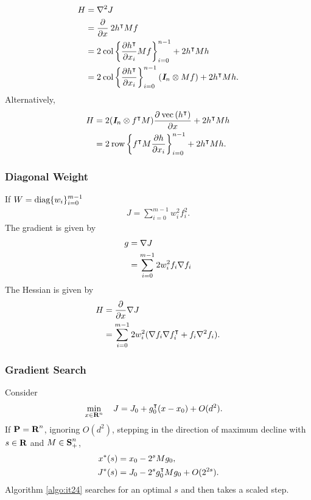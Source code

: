\documentclass{article}
\begin{document}
    \begin{align*}
        H&=\nabla^2 J\\
        &= \frac{\partial }{\partial x}\:2h^\intercal M f\\
        &=2\:\text{col}\left\{
        \frac{\partial h^\intercal}{\partial x_i} M f
        \right\}_{i=0}^{n-1}+2h^\intercal M h\\
        &=2\:\text{col}\left\{
            \frac{\partial h^\intercal}{\partial x_i} 
            \right\}_{i=0}^{n-1}
        \left(\emph{\textbf{I}}_n\otimes Mf\right)+2h^\intercal M h.
    \end{align*}
    Alternatively,
    \begin{align*}
        H&= 
        2(\emph{\textbf{I}}_n \otimes f^\intercal M)\frac{\partial \:\mathrm{vec}\left(h^\intercal\right)}{\partial x}+2h^\intercal M h\\
        &=2\:\text{row}\left\{
            f^\intercal M \frac{\partial h}{\partial x_i}
        \right\}_{i=0}^{n-1}+2h^\intercal M h.
    \end{align*}

    \subsubsection{Diagonal Weight}
    If $W=\text{diag}\{w_i\}_{i=0}^{m-1}$
    \begin{align*}
        J = \sum_{i=0}^{m-1} w_i^2 f_i^2.
    \end{align*}
    The gradient is given by
    \begin{align*}
        g&=\nabla J \\
        & = \sum_{i=0}^{m-1} 2 w_i^2 f_i \nabla f_i
    \end{align*}
    The Hessian is given by
    \begin{align*}
        H&=\frac{\partial }{\partial x}\nabla J \\
        &= \sum_{i=0}^{m-1} 2 w_i^2 (\nabla f_i \nabla f_i^\intercal+f_i \nabla^2 f_i).
    \end{align*}

\subsubsection{Gradient Search}

    Consider
    \begin{align*}
        \min_{x\in\textbf{R}^n}\quad J&=J_0 + g_0^\intercal(x-x_0)+ O(d^2).
    \end{align*}
    If $\textbf{P}=\textbf{R}^n$, ignoring $O(d^2)$, 
    stepping in the direction of maximum decline with $s\in\textbf{R}$ 
    and $M\in\textbf{S}_+^n$,
    \begin{align*}
        x^*(s) &=x_0-2^sMg_0,\\
        J^*(s) &= J_0 -2^s g_0^\intercal M g_0+O(2^{2s}).
    \end{align*}
    Algorithm \ref{algo:it24} searches for an optimal $s$ and then takes a scaled step.\\
\end{document}
